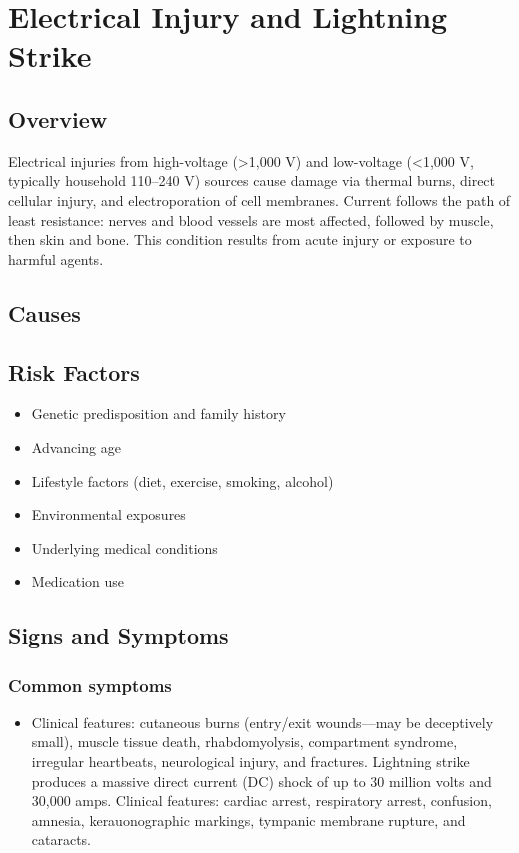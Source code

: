 \chapter{Electrical Injury and Lightning Strike}
\label{sec:Electrical Injury}

\section{Overview}
Electrical injuries from high-voltage (>1,000 V) and low-voltage (<1,000 V, typically household 110--240 V) sources cause damage via thermal burns, direct cellular injury, and electroporation of cell membranes. Current follows the path of least resistance: nerves and blood vessels are most affected, followed by muscle, then skin and bone. This condition results from acute injury or exposure to harmful agents.
\section{Causes}
\section{Risk Factors}

\begin{itemize}[noitemsep]
  \item Genetic predisposition and family history
  \item Advancing age
  \item Lifestyle factors (diet, exercise, smoking, alcohol)
  \item Environmental exposures
  \item Underlying medical conditions
  \item Medication use
\end{itemize}
\section{Signs and Symptoms}

\subsection{Common symptoms}
\begin{itemize}[noitemsep]
  \item Clinical features: cutaneous burns (entry/exit wounds---may be deceptively small), muscle tissue death, rhabdomyolysis, compartment syndrome, irregular heartbeats, neurological injury, and fractures. Lightning strike produces a massive direct current (DC) shock of up to 30 million volts and 30,000 amps. Clinical features: cardiac arrest, respiratory arrest, confusion, amnesia, kerauonographic markings, tympanic membrane rupture, and cataracts. 
  \end{itemize}

